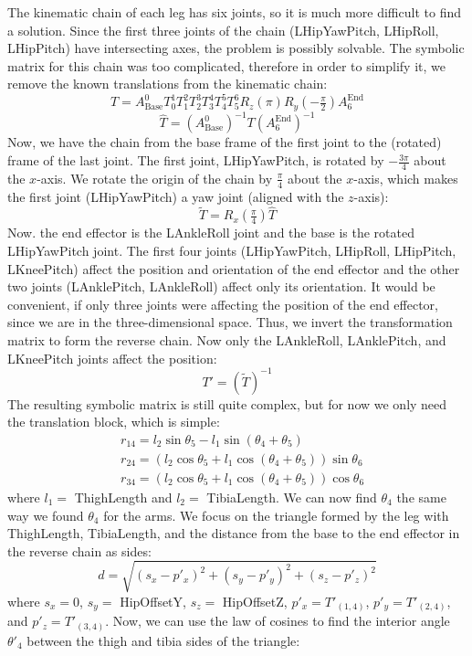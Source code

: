 The kinematic chain of each leg has six joints, so it is much more difficult to find a solution. Since the first three joints of the chain (LHipYawPitch,  LHipRoll, LHipPitch) have intersecting axes, the problem is possibly solvable. The symbolic matrix for this chain was too complicated, therefore in order to simplify it, we remove the known translations from the kinematic chain:
\[
T = A^0_\text{Base}T^1_0T^2_1T^3_2T^4_3T^5_4T^6_5R_z(\pi)R_y(-\tfrac{\pi}{2})A^\text{End}_6
\]
\[
\widehat{T} = {\left(A^0_\text{Base}\right)}^{-1}T{\left(A^\text{End}_6\right)}^{-1}
\]
Now, we have the chain from the base frame of the first joint to the (rotated) frame of the last joint. The first joint, LHipYawPitch, is rotated by $-\frac{3\pi}{4} $ about the $ x $-axis. We rotate the origin of the chain by $\frac{\pi}{4}$ about the $x$-axis, which makes the first joint (LHipYawPitch) a yaw joint (aligned with the $z$-axis):
\[
\widetilde{T} = R_x(\tfrac{\pi}{4})\widehat{T}
\]
Now. the end effector is the LAnkleRoll joint and the base is the rotated LHipYawPitch joint. The first four joints (LHipYawPitch, LHipRoll, LHipPitch, LKneePitch) affect the position and orientation of the end effector and the other two joints (LAnklePitch, LAnkleRoll) affect only its orientation. It would be convenient, if only three joints were affecting the position of the end effector, since we are in the three-dimensional space. Thus, we invert the transformation matrix to form the reverse chain. Now only the LAnkleRoll, LAnklePitch, and LKneePitch joints affect the position:
\[
T' = {\left(\widetilde{T}\right)}^{-1}
\]
The resulting symbolic matrix is still quite complex, but for now we only need the translation block, which is simple:
\begin{align*}
&r_{14} = l_2\sin\theta_5 - l_1\sin\left(\theta_4 + \theta_5\right)\\
&r_{24} = \left(l_2\cos\theta_5 + l_1 \cos\left(\theta_4 + \theta_5\right)\right)\sin\theta_6\\
&r_{34} = \left(l_2\cos\theta_5 + l_1 \cos\left(\theta_4 + \theta_5\right)\right)\cos\theta_6
\end{align*}
where $l_1 =$ ThighLength and $l_2 =$ TibiaLength.
We can now find $\theta_4$ the same way we found $\theta_4$ for the arms. We focus on the triangle formed by the leg with  ThighLength, TibiaLength, and the distance from the base to the end effector in the reverse chain as sides:
\[
d = \sqrt{\left(s_x-p'_x\right)^2 + \left(s_y-p'_y\right)^2 + \left(s_z-p'_z\right)^2}
\]
where $s_x = 0$, $s_y = $ HipOffsetY, $s_z =$ HipOffsetZ, $p'_x = T'_{(1,4)}$, $p'_y = T'_{(2,4)}$, and $p'_z = T'_{(3,4)}$. Now, we can use the law of cosines to find the interior angle $\theta'_4$ between the thigh and tibia sides of the triangle:
